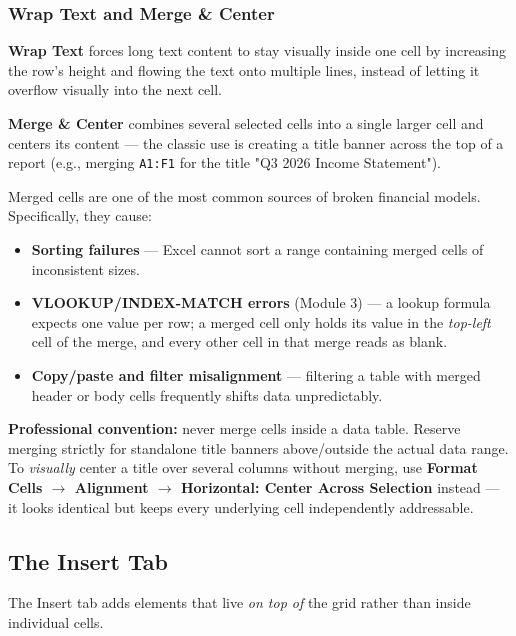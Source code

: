 \documentclass[11pt,a4paper]{article}
\begin{document}
\subsubsection{Wrap Text and Merge \& Center}

\textbf{Wrap Text} forces long text content to stay visually inside one cell by increasing the row's height and flowing the text onto multiple lines, instead of letting it overflow visually into the next cell.

\textbf{Merge \& Center} combines several selected cells into a single larger cell and centers its content --- the classic use is creating a title banner across the top of a report (e.g., merging \texttt{A1:F1} for the title "Q3 2026 Income Statement").

\begin{pitfall}
Merged cells are one of the most common sources of broken financial models. Specifically, they cause:
\begin{itemize}
  \item \textbf{Sorting failures} --- Excel cannot sort a range containing merged cells of inconsistent sizes.
  \item \textbf{VLOOKUP/INDEX-MATCH errors} (Module 3) --- a lookup formula expects one value per row; a merged cell only holds its value in the \emph{top-left} cell of the merge, and every other cell in that merge reads as blank.
  \item \textbf{Copy/paste and filter misalignment} --- filtering a table with merged header or body cells frequently shifts data unpredictably.
\end{itemize}
\textbf{Professional convention:} never merge cells inside a data table. Reserve merging strictly for standalone title banners above/outside the actual data range. To \emph{visually} center a title over several columns without merging, use \textbf{Format Cells $\rightarrow$ Alignment $\rightarrow$ Horizontal: Center Across Selection} instead --- it looks identical but keeps every underlying cell independently addressable.
\end{pitfall}

\subsection{The Insert Tab}

The Insert tab adds elements that live \emph{on top of} the grid rather than inside individual cells.
\end{document}
